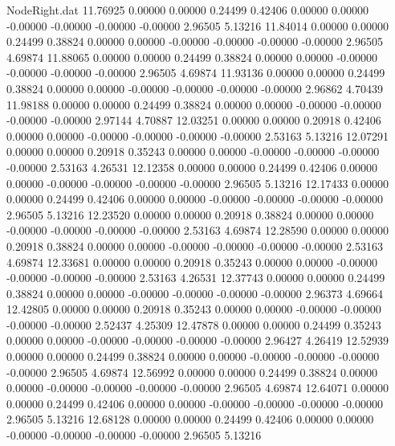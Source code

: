 \begin{filecontents}{NodeRight.dat}
  11.76925    0.00000    0.00000     0.24499    0.42406    0.00000    0.00000   -0.00000   -0.00000   -0.00000   -0.00000    2.96505    5.13216
  11.84014    0.00000    0.00000     0.24499    0.38824    0.00000    0.00000   -0.00000   -0.00000   -0.00000   -0.00000    2.96505    4.69874
  11.88065    0.00000    0.00000     0.24499    0.38824    0.00000    0.00000   -0.00000   -0.00000   -0.00000   -0.00000    2.96505    4.69874
  11.93136    0.00000    0.00000     0.24499    0.38824    0.00000    0.00000   -0.00000   -0.00000   -0.00000   -0.00000    2.96862    4.70439
  11.98188    0.00000    0.00000     0.24499    0.38824    0.00000    0.00000   -0.00000   -0.00000   -0.00000   -0.00000    2.97144    4.70887
  12.03251    0.00000    0.00000     0.20918    0.42406    0.00000    0.00000   -0.00000   -0.00000   -0.00000   -0.00000    2.53163    5.13216
  12.07291    0.00000    0.00000     0.20918    0.35243    0.00000    0.00000   -0.00000   -0.00000   -0.00000   -0.00000    2.53163    4.26531
  12.12358    0.00000    0.00000     0.24499    0.42406    0.00000    0.00000   -0.00000   -0.00000   -0.00000   -0.00000    2.96505    5.13216
  12.17433    0.00000    0.00000     0.24499    0.42406    0.00000    0.00000   -0.00000   -0.00000   -0.00000   -0.00000    2.96505    5.13216
  12.23520    0.00000    0.00000     0.20918    0.38824    0.00000    0.00000   -0.00000   -0.00000   -0.00000   -0.00000    2.53163    4.69874
  12.28590    0.00000    0.00000     0.20918    0.38824    0.00000    0.00000   -0.00000   -0.00000   -0.00000   -0.00000    2.53163    4.69874
  12.33681    0.00000    0.00000     0.20918    0.35243    0.00000    0.00000   -0.00000   -0.00000   -0.00000   -0.00000    2.53163    4.26531
  12.37743    0.00000    0.00000     0.24499    0.38824    0.00000    0.00000   -0.00000   -0.00000   -0.00000   -0.00000    2.96373    4.69664
  12.42805    0.00000    0.00000     0.20918    0.35243    0.00000    0.00000   -0.00000   -0.00000   -0.00000   -0.00000    2.52437    4.25309
  12.47878    0.00000    0.00000     0.24499    0.35243    0.00000    0.00000   -0.00000   -0.00000   -0.00000   -0.00000    2.96427    4.26419
  12.52939    0.00000    0.00000     0.24499    0.38824    0.00000    0.00000   -0.00000   -0.00000   -0.00000   -0.00000    2.96505    4.69874
  12.56992    0.00000    0.00000     0.24499    0.38824    0.00000    0.00000   -0.00000   -0.00000   -0.00000   -0.00000    2.96505    4.69874
  12.64071    0.00000    0.00000     0.24499    0.42406    0.00000    0.00000   -0.00000   -0.00000   -0.00000   -0.00000    2.96505    5.13216
  12.68128    0.00000    0.00000     0.24499    0.42406    0.00000    0.00000   -0.00000   -0.00000   -0.00000   -0.00000    2.96505    5.13216

\end{filecontents}
